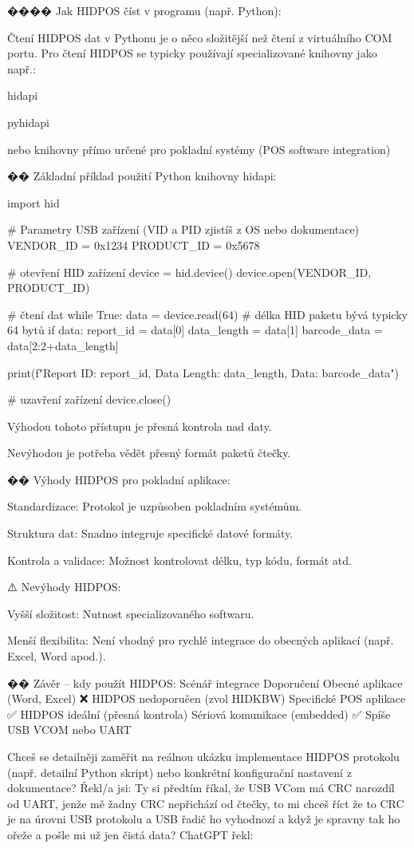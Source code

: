 ��‍�� Jak HIDPOS číst v programu (např. Python):

Čtení HIDPOS dat v Pythonu je o něco složitější než čtení z virtuálního COM portu. Pro čtení HIDPOS se typicky používají specializované knihovny jako např.:

    hidapi

    pyhidapi

    nebo knihovny přímo určené pro pokladní systémy (POS software integration)

��️ Základní příklad použití Python knihovny hidapi:

import hid

# Parametry USB zařízení (VID a PID zjistíš z OS nebo dokumentace)
VENDOR_ID = 0x1234  
PRODUCT_ID = 0x5678  

# otevření HID zařízení
device = hid.device()
device.open(VENDOR_ID, PRODUCT_ID)

# čtení dat
while True:
    data = device.read(64)  # délka HID paketu bývá typicky 64 bytů
    if data:
        report_id = data[0]
        data_length = data[1]
        barcode_data = data[2:2+data_length]
        
        print(f"Report ID: {report_id}, Data Length: {data_length}, Data: {barcode_data}")

# uzavření zařízení
device.close()

    Výhodou tohoto přístupu je přesná kontrola nad daty.

    Nevýhodou je potřeba vědět přesný formát paketů čtečky.

�� Výhody HIDPOS pro pokladní aplikace:

    Standardizace: Protokol je uzpůsoben pokladním systémům.

    Struktura dat: Snadno integruje specifické datové formáty.

    Kontrola a validace: Možnost kontrolovat délku, typ kódu, formát atd.

⚠️ Nevýhody HIDPOS:

    Vyšší složitost: Nutnost specializovaného softwaru.

    Menší flexibilita: Není vhodný pro rychlé integrace do obecných aplikací (např. Excel, Word apod.).

�� Závěr – kdy použít HIDPOS:
Scénář integrace	Doporučení
Obecné aplikace (Word, Excel)	❌ HIDPOS nedoporučen (zvol HIDKBW)
Specifické POS aplikace	✅ HIDPOS ideální (přesná kontrola)
Sériová komunikace (embedded)	✅ Spíše USB VCOM nebo UART

Chceš se detailněji zaměřit na reálnou ukázku implementace HIDPOS protokolu (např. detailní Python skript) nebo konkrétní konfigurační nastavení z dokumentace?
Řekl/a jsi:
Ty si předtím říkal, že USB VCom má CRC narozdíl od UART, jenže mě žadny CRC nepřichází od čtečky, to mi chceš říct že to CRC je na úrovni USB protokolu a USB řadič ho vyhodnozí a když je spravny tak ho ořeže a pošle mi už jen čistá data?
ChatGPT řekl:

